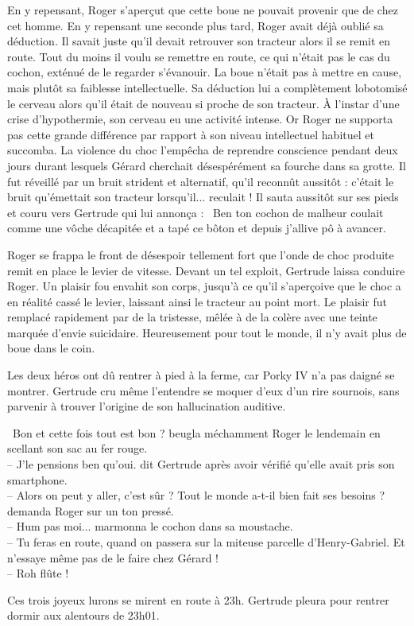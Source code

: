 \documentclass[a5paper, 10pt, twoside]{book}
\newcommand{\cg}{\guillemotleft~}
\newcommand{\cd}{~\guillemotright}
\begin{document}
En y repensant, Roger s'aperçut que cette boue ne pouvait provenir que de chez cet homme. En y repensant une seconde plus tard, Roger avait déjà oublié sa déduction. Il savait juste qu'il devait retrouver son tracteur alors il se remit en route. Tout du moins il voulu se remettre en route, ce qui n'était pas le cas du cochon, exténué de le regarder s'évanouir. La boue n'était pas à mettre en cause, mais plutôt sa faiblesse intellectuelle. Sa déduction lui a complètement lobotomisé le cerveau alors qu'il était de nouveau si proche de son tracteur. À l'instar d'une crise d'hypothermie, son cerveau eu une activité intense. Or Roger ne supporta pas cette grande différence par rapport à son niveau intellectuel habituel et succomba. La violence du choc l'empêcha de reprendre conscience pendant deux jours durant lesquels Gérard cherchait désespérément sa fourche dans sa grotte. Il fut réveillé par un bruit strident et alternatif, qu'il reconnût aussitôt : c'était le bruit qu'émettait son tracteur lorsqu'il... reculait ! Il sauta aussitôt sur ses pieds et couru vers Gertrude qui lui annonça : \cg Ben ton cochon de malheur coulait comme une vôche décapitée et a tapé ce bôton et depuis j'allive pô à avancer.\cd

Roger se frappa le front de désespoir tellement fort que l'onde de choc produite remit en place le levier de vitesse. Devant un tel exploit, Gertrude laissa conduire Roger. Un plaisir fou envahit son corps, jusqu'à ce qu'il s'aperçoive que le choc a en réalité cassé le levier, laissant ainsi le tracteur au point mort. Le plaisir fut remplacé rapidement par de la tristesse, mêlée à de la colère avec une teinte marquée d'envie suicidaire. Heureusement pour tout le monde, il n'y avait plus de boue dans le coin.

Les deux héros ont dû rentrer à pied à la ferme, car Porky IV n'a pas daigné se montrer. Gertrude cru même l'entendre se moquer d'eux d'un rire sournois, sans parvenir à trouver l'origine de son hallucination auditive.



\cg Bon et cette fois tout est bon ? beugla méchamment Roger le lendemain en scellant son sac au fer rouge.\\
-- J'le pensions ben qu'oui. dit Gertrude après avoir vérifié qu'elle avait pris son smartphone.\\
-- Alors on peut y aller, c'est sûr ? Tout le monde a-t-il bien fait ses besoins ? demanda Roger sur un ton pressé.\\
-- {\tiny Hum pas moi}... marmonna le cochon dans sa moustache.\\
-- Tu feras en route, quand on passera sur la miteuse parcelle d'Henry-Gabriel. Et n'essaye même pas de le faire chez Gérard !\\
-- Roh flûte !\cd

Ces trois joyeux lurons se mirent en route à 23h. Gertrude pleura pour rentrer dormir aux alentours de 23h01.
\end{document}

